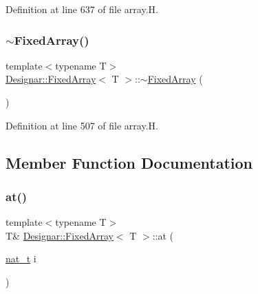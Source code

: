 Definition at line 637 of file array.\+H.

\mbox{\label{class_designar_1_1_fixed_array_adfe330be4cd4afd6a097cf5abd2cec38}} 
\subsubsection{\texorpdfstring{$\sim$\+Fixed\+Array()}{~FixedArray()}}
{\footnotesize\ttfamily template$<$typename T$>$ \\
\hyperlink{class_designar_1_1_fixed_array}{Designar\+::\+Fixed\+Array}$<$ T $>$\+::$\sim$\hyperlink{class_designar_1_1_fixed_array}{Fixed\+Array} (\begin{DoxyParamCaption}{ }\end{DoxyParamCaption})\hspace{0.3cm}{\ttfamily [inline]}}



Definition at line 507 of file array.\+H.



\subsection{Member Function Documentation}
\mbox{\label{class_designar_1_1_fixed_array_ae47f2f299aaef27f2decc88f2fd863a9}} 
\subsubsection{\texorpdfstring{at()}{at()}\hspace{0.1cm}{\footnotesize\ttfamily [1/2]}}
{\footnotesize\ttfamily template$<$typename T$>$ \\
T\& \hyperlink{class_designar_1_1_fixed_array}{Designar\+::\+Fixed\+Array}$<$ T $>$\+::at (\begin{DoxyParamCaption}\item[{\hyperlink{namespace_designar_aa72662848b9f4815e7bf31a7cf3e33d1}{nat\+\_\+t}}]{i }\end{DoxyParamCaption})\hspace{0.3cm}{\ttfamily [inline]}}




